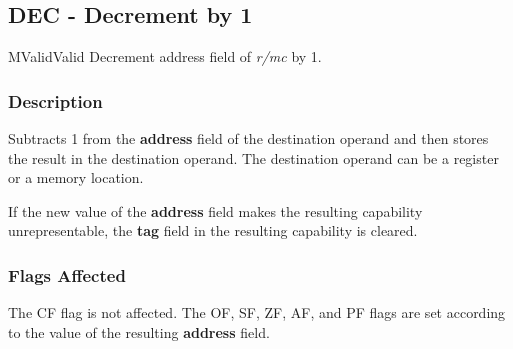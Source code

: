 \clearpage
{}
{}
\subsection*{DEC - Decrement by 1}

\begin{x86opcodetable}
  {M}{Valid}{Valid}
  {Decrement address field of \emph{r/mc} by 1.}
\end{x86opcodetable}

\begin{x86opentable}
\end{x86opentable}

\subsubsection*{Description}

Subtracts 1 from the \textbf{address} field of the destination operand
and then stores the result in the destination operand. The destination
operand can be a register or a memory location.

If the new value of the \textbf{address} field makes the resulting
capability unrepresentable, the \textbf{tag} field in the resulting
capability is cleared.

\subsubsection*{Flags Affected}

The CF flag is not affected.  The OF, SF, ZF, AF, and PF flags are set
according to the value of the resulting \textbf{address} field.
